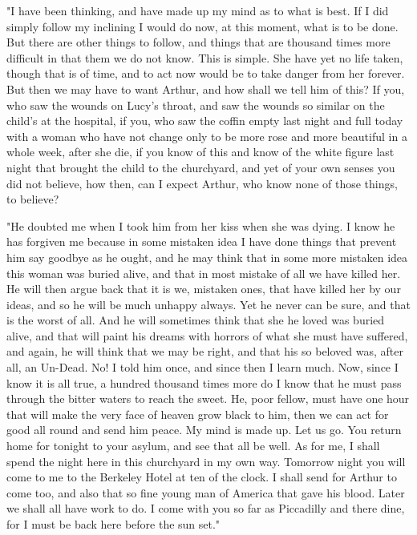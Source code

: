 "I have been thinking, and have made up my mind as to what is best. If I did simply follow my inclining I would do now, at this moment, what is to be done. But there are other things to follow, and things that are thousand times more difficult in that them we do not know. This is simple. She have yet no life taken, though that is of time, and to act now would be to take danger from her forever. But then we may have to want Arthur, and how shall we tell him of this? If you, who saw the wounds on Lucy's throat, and saw the wounds so similar on the child's at the hospital, if you, who saw the coffin empty last night and full today with a woman who have not change only to be more rose and more beautiful in a whole week, after she die, if you know of this and know of the white figure last night that brought the child to the churchyard, and yet of your own senses you did not believe, how then, can I expect Arthur, who know none of those things, to believe? 

"He doubted me when I took him from her kiss when she was dying. I know he has forgiven me because in some mistaken idea I have done things that prevent him say goodbye as he ought, and he may think that in some more mistaken idea this woman was buried alive, and that in most mistake of all we have killed her. He will then argue back that it is we, mistaken ones, that have killed her by our ideas, and so he will be much unhappy always. Yet he never can be sure, and that is the worst of all. And he will sometimes think that she he loved was buried alive, and that will paint his dreams with horrors of what she must have suffered, and again, he will think that we may be right, and that his so beloved was, after all, an Un-Dead. No! I told him once, and since then I learn much. Now, since I know it is all true, a hundred thousand times more do I know that he must pass through the bitter waters to reach the sweet. He, poor fellow, must have one hour that will make the very face of heaven grow black to him, then we can act for good all round and send him peace. My mind is made up. Let us go. You return home for tonight to your asylum, and see that all be well. As for me, I shall spend the night here in this churchyard in my own way. Tomorrow night you will come to me to the Berkeley Hotel at ten of the clock. I shall send for Arthur to come too, and also that so fine young man of America that gave his blood. Later we shall all have work to do. I come with you so far as Piccadilly and there dine, for I must be back here before the sun set." 


